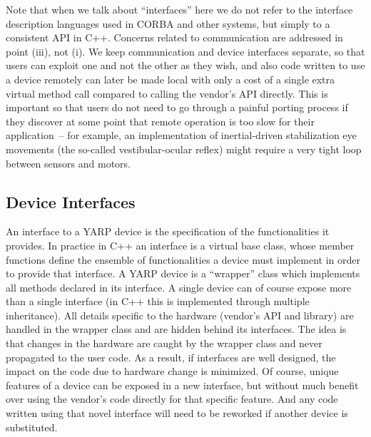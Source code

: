 Note that when we talk about ``interfaces'' here we do not refer to
the interface description languages used in CORBA and other systems,
but simply to a consistent API in C++.  Concerns related to
communication are addressed in point (iii), not (i).  We keep
communication and device interfaces separate, so that users can
exploit one and not the other as they wish, and also code written to
use a device remotely can later be made local with only a cost of a
single extra virtual method call compared to calling the vendor's API directly.
This is important so that users do not need to go through a painful
porting process if they discover at some point that remote operation
is too slow for their application~-- for example, an implementation
of inertial-driven stabilization eye movements (the so-called vestibular-ocular reflex)
might require a very tight loop between sensors and motors.



\subsection{Device Interfaces}
An interface to a YARP device is the specification of the functionalities
it provides. In practice in C++ an interface is a virtual base class, whose 
member functions define the ensemble of  functionalities a device must 
implement in order to provide that interface.  A YARP device is a 
``wrapper'' class which implements all methods declared in its interface. 
A single device can of course expose more than a single interface 
(in C++ this is implemented through multiple
inheritance). All details specific to the hardware 
(vendor's API and library) are handled in the wrapper class and are 
hidden behind its interfaces. 
The idea is that changes in the hardware are caught by the wrapper class 
and never propagated to the user code. As a result, if interfaces are 
well designed, the impact on the code due to hardware change is minimized. 
%
Of course, unique features of a device can be exposed in a new interface,
but without much benefit over using the vendor's code directly for that
specific feature.  And any code written using that novel interface will
need to be reworked if another device is substituted.

